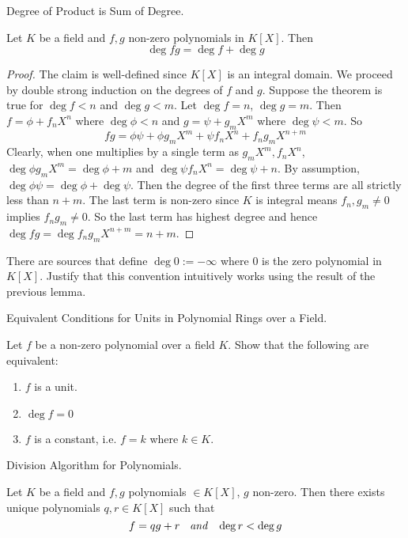 \documentclass[../../book.tex]{subfiles}
\begin{document}
\begin{lem} Degree of Product is Sum of Degree. 
    
    Let $K$ be a field and $f, g$ non-zero polynomials in $K[X]$. 
    Then \[\deg fg = \deg f + \deg g\]
\end{lem}
\begin{proof}
    The claim is well-defined since $K[X]$ is an integral domain.
    We proceed by double strong induction on the degrees of $f$ and $g$. 
    Suppose the theorem is true for $\deg f < n$ and $\deg g < m$. 
    Let $\deg f = n$, $\deg g = m$. 
    Then $f = \phi + f_n X^n$ where $\deg \phi < n$ and 
    $g = \psi + g_m X^m$ where $\deg \psi < m$. 
    So \[
    fg = \phi \psi + \phi g_m X^m + \psi f_n X^n + f_n g_m X^{n + m}
    \]
    Clearly, when one multiplies by a single term as $g_m X^m, f_n X^n$, 
    $\deg \phi g_m X^m = \deg \phi + m$ and $\deg \psi f_n X^n = \deg \psi + n$.
    By assumption, $\deg \phi\psi = \deg \phi + \deg \psi$.
    Then the degree of the first three terms are all strictly less than $n + m$.
    The last term is non-zero since $K$ is integral means $f_n, g_m \neq 0$
    implies $f_n g_m \neq 0$. 
    So the last term has highest degree and hence
    $\deg fg = \deg f_n g_m X^{n+m} = n + m$. 
\end{proof}
\begin{ex}
    There are sources that define $\deg 0 := -\infty$ where
    $0$ is the zero polynomial in $K[X]$.
    Justify that this convention intuitively works using the result of the previous lemma.
\end{ex}
\begin{ex} Equivalent Conditions for Units in Polynomial Rings over a Field.

    Let $f$ be a non-zero polynomial over a field $K$. 
    Show that the following are equivalent: \begin{enumerate}
        \item $f$ is a unit.
        \item $\deg f = 0$
        \item $f$ is a constant, i.e. $f = k$ where $k \in K$. 
    \end{enumerate}
\end{ex}
\begin{lem} Division Algorithm for Polynomials.
    
    Let $K$ be a field and $f, g$ polynomials $\in K[X]$, $g$ non-zero.
    Then there exists unique polynomials $q, r \in K[X]$ such that \[
        f = q g + r \;\;\emph{ and }\;\; \deg r < \deg g
    \]
\end{lem}
\end{document}
